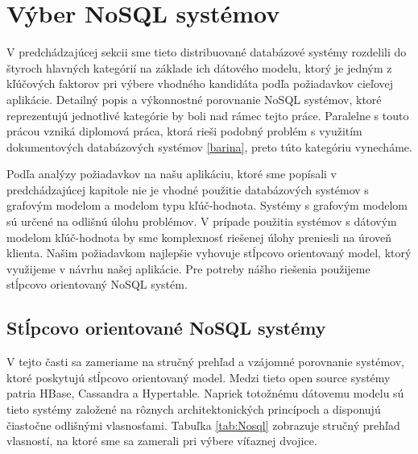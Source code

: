 \documentclass[11pt,twoside,a4paper]{book}
\begin{document}


\section{Výber NoSQL systémov}

V predchádzajúcej sekcii sme tieto distribuované databázové systémy rozdelili do štyroch hlavných kategórií na základe ich dátového modelu, ktorý je jedným z kľúčových faktorov pri výbere vhodného kandidáta podľa požiadavkov cieľovej aplikácie. Detailný popis a výkonnostné porovnanie NoSQL systémov, ktoré reprezentujú jednotlivé kategórie by boli nad rámec tejto práce. Paralelne s touto prácou vzniká diplomová práca, ktorá rieši podobný problém s využitím dokumentových databázových systémov  \ref{barina}, preto túto kategóriu vynecháme.

Podľa analýzy požiadavkov na našu aplikáciu, ktoré sme popísali v predchádzajúcej kapitole nie je vhodné použitie databázových systémov s grafovým modelom a modelom typu kľúč-hodnota. Systémy s grafovým modelom sú určené na odlišnú úlohu problémov. V prípade použitia systémov s dátovým modelom kľúč-hodnota by sme komplexnosť riešenej úlohy preniesli na úroveň klienta. Našim požiadavkom najlepšie vyhovuje stĺpcovo orientovaný model, ktorý využijeme v návrhu našej aplikácie. Pre potreby nášho riešenia použijeme stĺpcovo orientovaný NoSQL systém.

\subsection*{Stĺpcovo orientované NoSQL systémy}
V tejto časti sa zameriame na stručný prehľad a vzájomné porovnanie systémov, ktoré poskytujú stĺpcovo orientovaný model. Medzi tieto open source systémy patria HBase, Cassandra a Hypertable. Napriek totožnému dátovemu modelu sú tieto systémy založené na rôznych architektonických princípoch a disponujú čiastočne odlišnými vlasnosťami. Tabuľka \ref{tab:Nosql} zobrazuje stručný prehľad vlasností, na ktoré sme sa zamerali pri výbere víťaznej dvojice.
\end{document}
